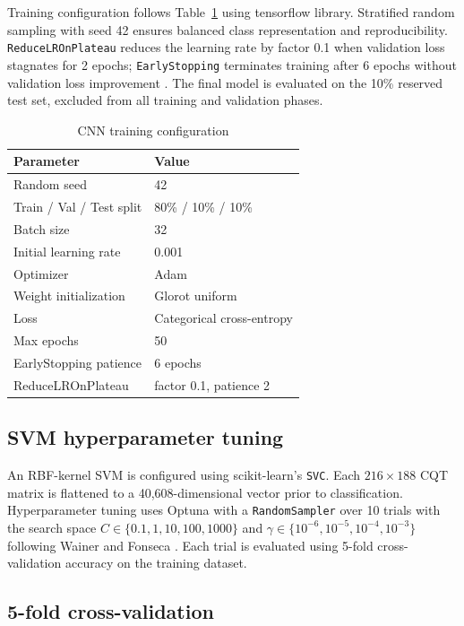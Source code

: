 \documentclass[pdflatex,sn-mathphys-num,iicol]{sn-jnl}
\theoremstyle{thmstyleone}
\theoremstyle{thmstyletwo}
\theoremstyle{thmstylethree}
\begin{document}
Training configuration follows Table~\ref{tab:cnn-training-config} using tensorflow library. Stratified random sampling with seed 42 ensures balanced class representation and reproducibility. \texttt{ReduceLROnPlateau} reduces the learning rate by factor 0.1 when validation loss stagnates for 2 epochs; \texttt{EarlyStopping} terminates training after 6 epochs without validation loss improvement \cite{Wolf-Monheim2025}. The final model is evaluated on the 10\% reserved test set, excluded from all training and validation phases.

\begin{table}[h]
\caption{CNN training configuration}\label{tab:cnn-training-config}
\begin{tabular}{@{}ll@{}}
\toprule
Parameter & Value \\
\midrule
Random seed & 42 \\
Train / Val / Test split & 80\% / 10\% / 10\% \\
Batch size & 32 \\
Initial learning rate & 0.001 \\
Optimizer & Adam \\
Weight initialization & Glorot uniform \\
Loss & Categorical cross-entropy \\
Max epochs & 50 \\
EarlyStopping patience & 6 epochs \\
ReduceLROnPlateau & factor 0.1, patience 2 \\
\bottomrule
\end{tabular}
\end{table}

\subsection{SVM hyperparameter tuning}\label{subsec3_4}

An RBF-kernel SVM is configured using scikit-learn's \texttt{SVC}. Each $216 \times 188$ CQT matrix is flattened to a 40,608-dimensional vector prior to classification. Hyperparameter tuning uses Optuna with a \texttt{RandomSampler} over 10 trials with the search space $C \in \{0.1, 1, 10, 100, 1000\}$ and $\gamma \in \{10^{-6}, 10^{-5}, 10^{-4}, 10^{-3}\}$ following Wainer and Fonseca \cite{Wainer2020}. Each trial is evaluated using 5-fold cross-validation accuracy on the training dataset.

\subsection{5-fold cross-validation}\label{subsec3_5}
\end{document}
